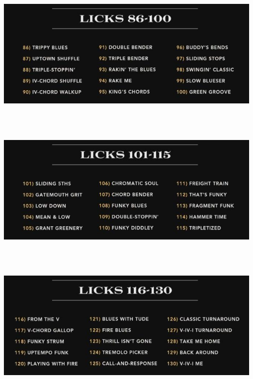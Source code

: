 \documentclass[a4paper]{book}
\begin{document}
\clearpage

\begin{center}
\includegraphics[width=17cm,height=6.881cm]{lebluessupportsmethodes-img22.jpg}
\end{center}


\begin{center}
\includegraphics[width=17cm,height=6.881cm]{lebluessupportsmethodes-img23.jpg}
\end{center}


\begin{center}
\includegraphics[width=17cm,height=6.881cm]{lebluessupportsmethodes-img24.jpg}
\end{center}
\end{document}
